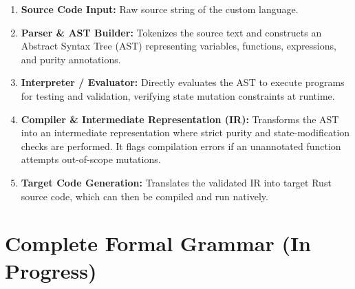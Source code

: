 \documentclass[12pt, letterpaper]{article}
\begin{document}
\begin{enumerate}
    \item \textbf{Source Code Input:} Raw source string of the custom language.
    \item \textbf{Parser \& AST Builder:} Tokenizes the source text and constructs an Abstract Syntax Tree (AST) representing variables, functions, expressions, and purity annotations.
    \item \textbf{Interpreter / Evaluator:} Directly evaluates the AST to execute programs for testing and validation, verifying state mutation constraints at runtime.
    \item \textbf{Compiler \& Intermediate Representation (IR):} Transforms the AST into an intermediate representation where strict purity and state-modification checks are performed. It flags compilation errors if an unannotated function attempts out-of-scope mutations.
    \item \textbf{Target Code Generation:} Translates the validated IR into target Rust source code, which can then be compiled and run natively.
\end{enumerate}

\section{Complete Formal Grammar (In Progress)}

\newcommand{\concat}{%
  \mathbin{{+}\mspace{-8mu}{+}}%
}
\end{document}
